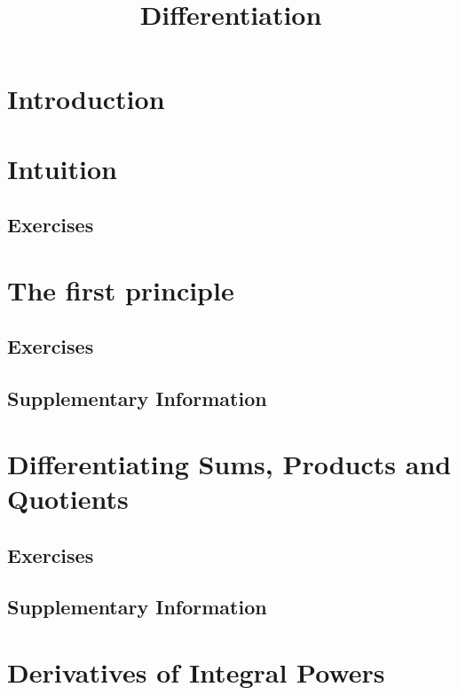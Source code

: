 \documentclass{fts_m2}
\title{Differentiation}
\begin{document}
    \maketitle
    \section*{Introduction}
    
    \tableofcontents

    \section{Intuition}
    
    \subsection*{Exercises}
      
    
    \section{The first principle}
    
    \subsection*{Exercises}
    
    \subsection*{Supplementary Information}
    

    \section{Differentiating Sums, Products and Quotients}
    
    \subsection*{Exercises}
    
    \subsection*{Supplementary Information}
    

    \section{Derivatives of Integral Powers}
    
\end{document}
